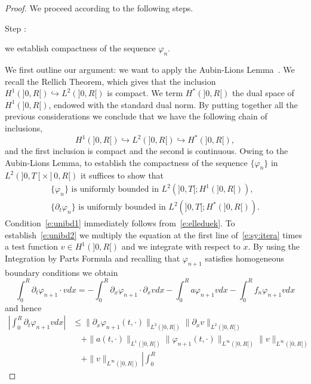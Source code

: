 \documentclass[11pt,leqno]{amsart}
\newcounter{stepnb}
\numberwithin{equation}{section}
\begin{document}
\begin{proof}
We proceed according to the following steps. \\
{\setcounter{stepnb}{0}}
{{{\sc \addtocounter{stepnb}{1}\noindent  Step :} {we establish compactness of the sequence $\varphi_n$}.}} We first outline our argument: we want to apply the Aubin-Lions Lemma~\cite{Si}. We recall the Rellich
Theorem, which gives that the inclusion $H^1(]0, R[) \hookrightarrow L^2 (]0, R[)$ is compact.
 We term $H^\ast (]0, R[)$ the dual space of $H^1(]0, R[)$, endowed with the standard dual norm. By putting together all the previous considerations we conclude that we have the following chain of inclusions, 
$$
    H^1 (]0, R[) \hookrightarrow L^2 (]0, R[) \hookrightarrow H^\ast (]0, R[), 
$$ 
and the first inclusion is compact and the second is continuous. Owing to the Aubin-Lions Lemma, to establish the compactness of the sequence $\{ {\varphi}_n \}$ in $L^2 (]0, T[ \times ]0, R[)$ it suffices to show that
\begin{eqnarray}
\label{e:suffcond}
     \text{$\{ {\varphi}_n \}$ is uniformly bounded in $L^2 (]0, T[; H^1(]0, R[))$}, 
     \label{e:unibd1}
     \\
     \text{$\{ {\partial_t} {\varphi}_n \}$ is uniformly bounded in $L^2 (]0, T[; H^\ast (]0, R[))$}.
     \label{e:unibd2}  
\end{eqnarray} 
Condition~\eqref{e:unibd1} immediately follows from~\eqref{e:elleduek}. To establish~\eqref{e:unibd2} we multiply the equation at the first line of~\eqref{e:sy:itera} times a test function $v \in H^1 (]0, R[)$ and we integrate with respect to $x$.
By using the Integration by Parts Formula and recalling that ${\varphi}_{n+1}$ satisfies homogeneous boundary conditions we obtain 
$$
   \int_0^R {\partial_t} {\varphi}_{n+1} \cdot v dx=
   - \int_0^R {\partial_x } {\varphi}_{n+1} \cdot  {\partial_x } v dx -
    \int_0^R a {\varphi}_{n+1} v dx - 
    \int_0^R f_n {\varphi}_{n+1} v dx
$$ 
and hence 
\begin{equation}
  \label{e:boundsufhit}
  \begin{split}
    \left| \int_0^R {\partial_t} {\varphi}_{n+1} v dx \right| & \leq \| {\partial_x }
    {\varphi}_{n+1} (t, \cdot) \|_{L^2 (]0, R[)} \| {\partial_x } v \|_{L^2 (]0, R[)}
    \\
    & \quad + \| a(t, \cdot) \|_{L^1 (]0, R[)} \| {\varphi}_{n+1} (t, \cdot)
    \|_{L^\infty (]0, R[)}
    \| v \|_{L^\infty (]0, R[)} 
    \\
    & \quad + \|v \|_{L^\infty (]0, R[)} \left| \int_0^R

\end{split}
\end{equation}
\end{proof}
\end{document}
